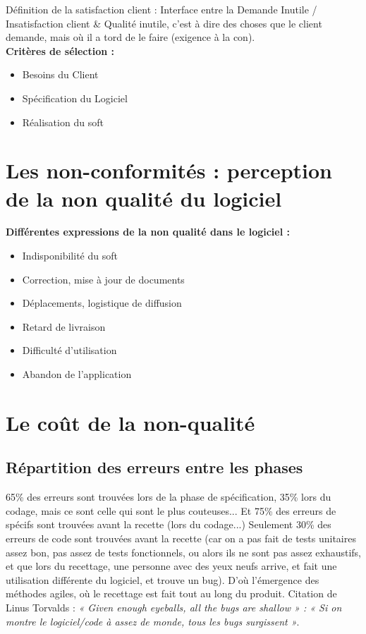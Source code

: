 Définition de la satisfaction client : Interface entre la Demande Inutile / Insatisfaction client \& Qualité inutile, c’est à dire des choses que le client demande, mais où il a tord de le faire (exigence à la con).\\

	\textbf{Critères de sélection  :}\hfill\\
	\begin{itemize}
		\item Besoins du Client
		\item Spécification du Logiciel
		\item Réalisation du soft
	\end{itemize}


\section{Les non-conformités : perception de la non qualité du logiciel}

\textbf{Différentes expressions de la non qualité dans le logiciel :}\hfill\\

\begin{itemize}
    \item Indisponibilité du soft
    \item Correction, mise à jour de documents
    \item Déplacements, logistique de diffusion
    \item Retard de livraison
    \item Difficulté d’utilisation
    \item Abandon de l’application
\end{itemize}




\section{Le coût de la non-qualité}

	\subsection{Répartition des erreurs entre les phases}



65\% des erreurs sont trouvées lors de la phase de spécification, 35\% lors du codage, mais ce sont celle qui sont le plus couteuses...
Et  75\% des erreurs de spécifs sont trouvées avant la recette (lors du codage...)
Seulement 30\% des erreurs de code sont trouvées avant la recette (car on a pas fait de tests unitaires assez bon, pas assez de tests fonctionnels, ou alors ils ne sont pas assez exhaustifs, et que lors du recettage, une personne avec des yeux neufs arrive, et fait une utilisation différente du logiciel, et trouve un bug). D’où l’émergence des méthodes agiles, où le recettage est fait tout au long du produit. Citation de Linus Torvalds : \textit{« Given enough eyeballs, all the bugs are shallow » : « Si on montre le logiciel/code à assez de monde, tous les bugs surgissent »}.

